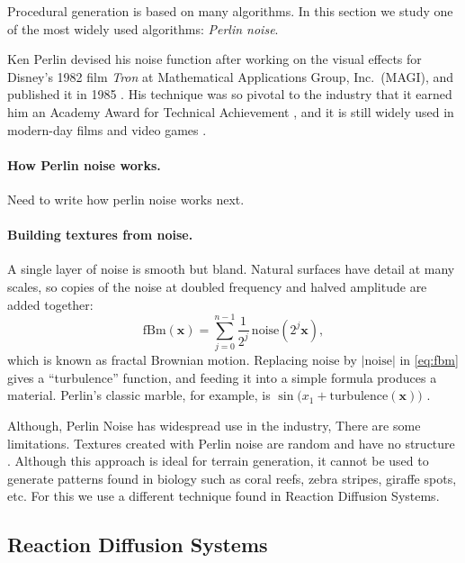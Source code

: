\documentclass[a4paper, 11pt]{article}
\begin{document}

Procedural generation is based on many algorithms. In this section we study one of the most widely used algorithms: \emph{Perlin noise}.


Ken Perlin devised his noise function after working on the visual effects for Disney's 1982 film \emph{Tron} at Mathematical Applications Group, Inc.\ (MAGI), and published it in 1985 \parencite{perlin1985}. His technique was so pivotal to the industry that it earned him an Academy Award for Technical Achievement \parencite{nyuperlin}, and it is still widely used in modern-day films and video games \parencite{lagae2010}.

\paragraph{How Perlin noise works.}
Need to write how perlin noise works next.

\paragraph{Building textures from noise.}
A single layer of noise is smooth but bland. Natural surfaces have detail at many scales, so copies of the noise at doubled frequency and halved amplitude are added together:
\begin{equation}
	\label{eq:fbm}
	\mathrm{fBm}(\mathbf{x}) = \sum_{j=0}^{n-1} \frac{1}{2^j}\, \mathrm{noise}\!\left(2^j \mathbf{x}\right),
\end{equation}
which is known as fractal Brownian motion. Replacing $\mathrm{noise}$ by $\lvert \mathrm{noise} \rvert$ in \cref{eq:fbm} gives a ``turbulence'' function, and feeding it into a simple formula produces a material. Perlin's classic marble, for example, is $\sin\bigl(x_1 + \mathrm{turbulence}(\mathbf{x})\bigr)$ \parencite{perlin1985}.

Although, Perlin Noise has widespread use in the industry, There are some limitations.
Textures created with Perlin noise are random and have no structure \parencite{lagae2010}. Although this approach is ideal for terrain generation, it cannot be used to generate patterns found in biology such as coral reefs, zebra stripes, giraffe spots, etc. For this we use a different technique found in Reaction Diffusion Systems.


\subsection{Reaction Diffusion Systems}
\label{sec:rd-systems}
\end{document}
